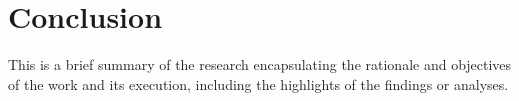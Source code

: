 \chapter{Conclusion}
\label{chap:conclusion}

This is a brief summary of the research encapsulating the rationale and objectives of the work and its execution, including the highlights of the findings or analyses.
